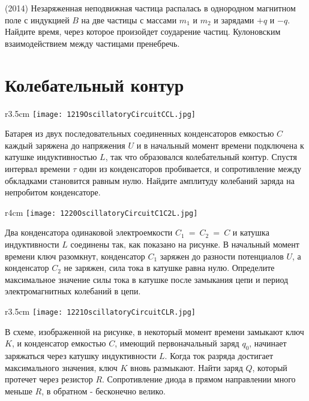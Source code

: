 \AddProb (2014) Незаряженная неподвижная частица распалась в однородном магнитном поле с индукцией $B$ на две частицы с массами $m_1$ и $m_2$ и зарядами $+q$ и $-q$. Найдите время, через которое произойдет соударение частиц. Кулоновским взаимодействием между частицами пренебречь.

\section{Колебательный контур}

\begin{wrapfigure}{r}{3.5cm}
\texttt{[image: 1219OscillatoryCircuitCCL.jpg]}
\end{wrapfigure}

\AddProb Батарея из двух последовательных соединенных конденсаторов емкостью $C$ каждый заряжена до напряжения $U$ 
и в начальный момент времени подключена к катушке индуктивностью $L$, так что образовался колебательный контур. 
Спустя интервал времени $\tau$ один из конденсаторов пробивается, и сопротивление между обкладками становится равным нулю. 
Найдите амплитуду колебаний заряда на непробитом конденсаторе.

\begin{wrapfigure}{r}{4cm}
\texttt{[image: 1220OscillatoryCircuitC1C2L.jpg]}
\end{wrapfigure}

\AddProb Два конденсатора одинаковой электроемкости $C_1~=~C_2~=~C$ и катушка индуктивности $L$ соединены так, как показано на рисунке. 
В начальный момент времени ключ разомкнут, конденсатор $C_1$ заряжен до разности потенциалов $U$, а конденсатор $C_2$ не заряжен, 
сила тока в катушке равна нулю. Определите максимальное значение силы тока в катушке после замыкания цепи и период электромагнитных колебаний в цепи. 

\begin{wrapfigure}{r}{3.5cm}
\texttt{[image: 1221OscillatoryCircuitCLR.jpg]}
\end{wrapfigure}

\AddProb В схеме, изображенной на рисунке, в некоторый момент времени замыкают ключ $K$, и конденсатор емкостью $C$, 
имеющий первоначальный заряд $q_0$, начинает заряжаться через катушку индуктивности $L$. 
Когда ток разряда достигает максимального значения, ключ $K$ вновь размыкают. Найти заряд $Q$, который протечет через резистор $R$. 
Сопротивление диода в прямом направлении много меньше $R$, в обратном - бесконечно велико.

